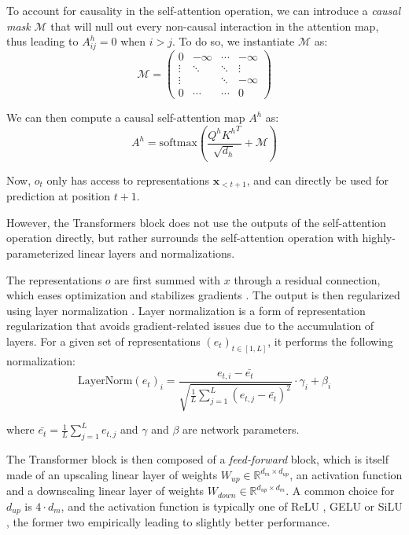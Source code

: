To account for causality in the self-attention operation, we can introduce a \textit{causal mask} $\mathcal{M}$ that will null out every non-causal interaction in the attention map, thus leading to $A^h_{ij} = 0$ when $i > j$. To do so, we instantiate $\mathcal{M}$ as:
\begin{equation*}
    \mathcal{M} = \begin{pmatrix}
        0 & -\infty & \cdots & -\infty \\
        \vdots & \ddots & \ddots & \vdots \\
        \vdots &  & \ddots & -\infty \\
        0 & \cdots & \cdots & 0

    \end{pmatrix}
\end{equation*}

We can then compute a causal self-attention map $A^h$ as:
$$
A^h = \text{softmax} \left(\frac{Q^h {K^h}^T}{\sqrt{d_h}} + \mathcal{M} \right)
$$

Now, $o_t$ only has access to representations $\mathbf{x}_{<t+1}$, and can directly be used for prediction at position $t+1$.

However, the Transformers block does not use the outputs of the self-attention operation directly, but rather surrounds the self-attention operation with highly-parameterized linear layers and normalizations. 

The representations $o$ are first summed with $x$ through a residual connection, which eases optimization and stabilizes gradients \citep{residual_conn}. The output is then regularized using layer normalization \citep{ba2016layernormalization}. Layer normalization is a form of representation regularization that avoids gradient-related issues due to the accumulation of layers. For a given set of representations $(e_t)_{t\in [1, L]}$, it performs the following normalization:
$$
\text{LayerNorm}(e_t)_i = \frac{e_{t, i} - \bar{e_t}}{\sqrt{\frac{1}{L} \sum_{j=1}^{L} (e_{t, j} - \bar{e_t})^2}} \cdot \gamma_i + \beta_i
$$

where $\bar{e_t}=\frac{1}{L} \sum_{j=1}^{L} e_{t, j}$ and $\gamma$ and $\beta$ are network parameters.

The Transformer block is then composed of a \textit{feed-forward} block, which is itself made of an upscaling linear layer of weights $W_{up} \in \mathbb{R}^{d_m \times d_{up}}$, an activation function and a downscaling linear layer of weights $W_{down} \in \mathbb{R}^{d_{up} \times d_m}$. A common choice for $d_{up}$ is $4 \cdot d_m$, and the activation function is typically one of ReLU \citep{relu}, GELU \citep{hendrycks2023gaussianerrorlinearunits} or SiLU \citep{silu}, the former two empirically leading to slightly better performance.


